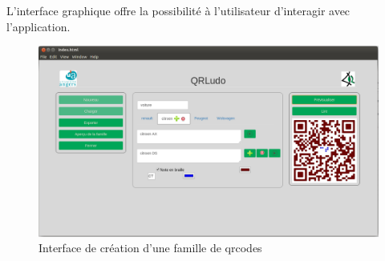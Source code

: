 \par
L'interface graphique offre la possibilité à l'utilisateur d'interagir avec l'application.

\begin{figure}[!h]
	\centering
   \includegraphics[scale=0.25]{img/interface.png}
   \caption{Interface de création d'une famille de qrcodes}
\end{figure}

